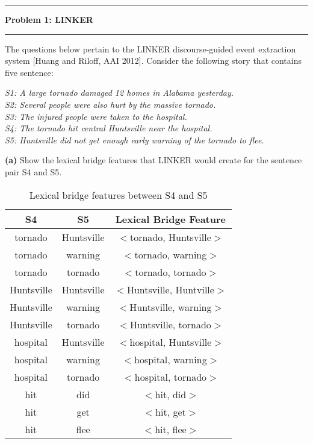 \documentclass[11pt]{article}
\newcommand\question[2]{\vspace{.25in}\hrule\textbf{#1: #2}\vspace{.5em}\hrule\vspace{.10in}}
\renewcommand\part[1]{\vspace{.10in}\textbf{(#1)}}
\begin{document}
\raggedright

\newcommand\NAME{Jake Pitkin}
\newcommand\UID{u0891770}
\newcommand\HWNUM{3}

\question{Problem 1}{LINKER}

The questions below pertain to the LINKER discourse-guided event extraction system [Huang and Riloff, AAI 2012]. Consider the following story that contains five sentence:

\textit{S1: A large tornado damaged 12 homes in Alabama yesterday. \\
S2: Several people were also hurt by the massive tornado. \\
S3: The injured people were taken to the hospital. \\
S4: The tornado hit central Huntsville near the hospital. \\
S5: Huntsville did not get enough early warning of the tornado to flee. \\}

\part{a} Show the lexical bridge features that LINKER would create for the sentence pair S4 and S5.

 \begin{table}[H]
\centering
{\renewcommand{\arraystretch}{1.2}%
\begin{tabular}{| c | c | c |}
\hline
\textbf{S4} & \textbf{S5} & \textbf{Lexical Bridge Feature}\\
\hline
tornado & Huntsville & $<$tornado, Huntsville$>$ \\ \hline
tornado & warning & $<$tornado, warning$>$ \\ \hline
tornado & tornado & $<$tornado, tornado$>$ \\ \hline
Huntsville & Huntsville & $<$Huntsville, Huntville$>$ \\ \hline
Huntsville & warning & $<$Huntsville, warning$>$ \\ \hline
Huntsville & tornado & $<$Huntsville, tornado$>$ \\ \hline
hospital & Huntsville & $<$hospital, Huntsville$>$ \\ \hline
hospital & warning & $<$hospital, warning$>$ \\ \hline
hospital & tornado & $<$hospital, tornado$>$ \\ \hline
hit & did & $<$hit, did$>$ \\ \hline
hit & get & $<$hit, get$>$ \\ \hline
hit & flee & $<$hit, flee$>$ \\ \hline
\end{tabular}}
\caption{Lexical bridge features between S4 and S5}
\end{table}
\end{document}
